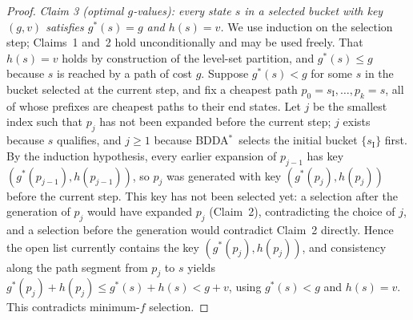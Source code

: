 \documentclass[letterpaper]{article}
\newcommand{\sinit}{\ensuremath{s_{\mathrm{I}}}}
\newcommand{\gstar}{\ensuremath{g^{*}}}
\newcommand{\bddastar}{BDDA\ensuremath{^{*}}}
\theoremstyle{plain}
\theoremstyle{definition}
\theoremstyle{remark}
\begin{document}
\begin{proof}
\emph{Claim 3 (optimal $g$-values): every state $s$ in a selected
bucket with key $(g,v)$ satisfies $\gstar(s) = g$ and $h(s) = v$.}
We use induction on the selection step; Claims~1 and~2 hold
unconditionally and may be used freely. That $h(s) = v$ holds by
construction of the level-set partition, and $\gstar(s) \leq g$ because
$s$ is reached by a path of cost $g$. Suppose $\gstar(s) < g$ for some
$s$ in the bucket selected at the current step, and fix a cheapest path
$p_0 = \sinit, \dots, p_k = s$, all of whose prefixes are cheapest
paths to their end states. Let $j$ be the smallest index such that
$p_j$ has not been expanded before the current step; $j$ exists because
$s$ qualifies, and $j \geq 1$ because \bddastar\ selects the initial
bucket $\{\sinit\}$ first. By the induction hypothesis, every earlier
expansion of $p_{j-1}$ has key $(\gstar(p_{j-1}), h(p_{j-1}))$, so
$p_j$ was generated with key $(\gstar(p_j), h(p_j))$ before the current
step. This key has not been selected yet: a selection after the
generation of $p_j$ would have expanded $p_j$ (Claim~2), contradicting
the choice of $j$, and a selection before the generation would
contradict Claim~2 directly. Hence the open list currently contains the
key $(\gstar(p_j), h(p_j))$, and consistency along the path segment
from $p_j$ to $s$ yields
$\gstar(p_j) + h(p_j) \leq \gstar(s) + h(s) < g + v$, using
$\gstar(s) < g$ and $h(s) = v$. This contradicts minimum-$f$ selection.


\end{proof}
\end{document}

